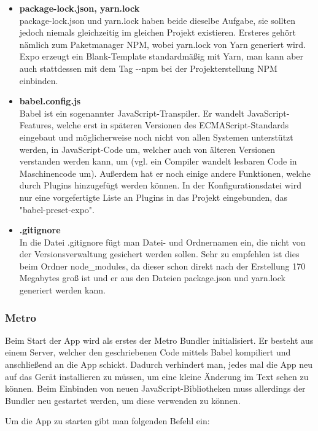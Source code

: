 \begin{itemize}
\begin{itemize}
\item \textbf{package-lock.json, yarn.lock}\\
package-lock.json und yarn.lock haben beide dieselbe Aufgabe, sie sollten jedoch niemals
gleichzeitig im gleichen Projekt existieren. Ersteres gehört nämlich zum Paketmanager NPM, wobei
yarn.lock von Yarn generiert wird. Expo erzeugt ein Blank-Template standardmäßig mit Yarn, man kann
aber auch stattdessen mit dem Tag -{}-npm bei der Projekterstellung NPM einbinden.

\item \textbf{babel.config.js}\\
Babel ist ein sogenannter JavaScript-Transpiler. Er wandelt JavaScript-Features, welche erst in
späteren Versionen des ECMAScript-Standards eingebaut und möglicherweise noch nicht von allen
Systemen unterstützt werden, in JavaScript-Code um, welcher auch von älteren Versionen verstanden
werden kann, um (vgl. ein Compiler wandelt lesbaren Code in Maschinencode um). Außerdem hat er noch
einige andere Funktionen, welche durch Plugins hinzugefügt werden können. In der Konfigurationsdatei
wird nur eine vorgefertigte Liste an Plugins in das Projekt eingebunden, das "babel-preset-expo".

\item \textbf{.gitignore}\\
In die Datei .gitignore fügt man Datei- und Ordnernamen ein, die nicht von der Versionsverwaltung
gesichert werden sollen. Sehr zu empfehlen ist dies beim Ordner node\_modules, da dieser schon
direkt nach der Erstellung 170 Megabytes groß ist und er aus den Dateien package.json und yarn.lock
generiert werden kann.

\end{itemize}
\end{itemize}

\subsubsection{Metro}
\label{metrobundler}
Beim Start der App wird als erstes der Metro Bundler initialisiert. Er besteht aus einem Server,
welcher den geschriebenen Code mittels Babel kompiliert und anschließend an die App schickt. Dadurch
verhindert man, jedes mal die App neu auf das Gerät installieren zu müssen, um eine kleine Änderung
im Text sehen zu können. Beim Einbinden von neuen JavaScript-Bibliotheken muss allerdings der
Bundler neu gestartet werden, um diese verwenden zu können.

Um die App zu starten gibt man folgenden Befehl ein:

